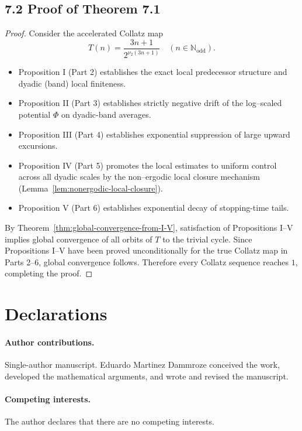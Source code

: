 \documentclass[preprint,12pt]{elsarticle}
\begin{document}
\subsection{7.2 Proof of Theorem 7.1}
\begin{proof}
Consider the accelerated Collatz map
\[
T(n)=\frac{3n+1}{2^{\nu_2(3n+1)}}\quad (n\in\mathbb{N}_{\mathrm{odd}}).
\]
\begin{itemize}
\item Proposition I (Part 2) establishes the exact local predecessor structure and dyadic (band) local finiteness.
\item Proposition II (Part 3) establishes strictly negative drift of the log--scaled potential $\Phi$ on dyadic-band averages.
\item Proposition III (Part 4) establishes exponential suppression of large upward excursions.
\item Proposition IV (Part 5) promotes the local estimates to uniform control across all dyadic scales by the non--ergodic local closure mechanism (Lemma~\ref{lem:nonergodic-local-closure}).
\item Proposition V (Part 6) establishes exponential decay of stopping-time tails.
\end{itemize}
By Theorem~\ref{thm:global-convergence-from-I-V}, satisfaction of Propositions I–V implies global convergence of all orbits of \(T\) to the trivial cycle. Since Propositions I–V have been proved unconditionally for the true Collatz map in Parts 2–6, global convergence follows.
Therefore every Collatz sequence reaches $1$, completing the proof.
\end{proof}

\section*{Declarations}

\paragraph{Author contributions.}
Single-author manuscript. Eduardo Martinez Dammroze conceived the work, developed the mathematical arguments, and wrote and revised the manuscript.

\paragraph{Competing interests.}
The author declares that there are no competing interests.
\end{document}
